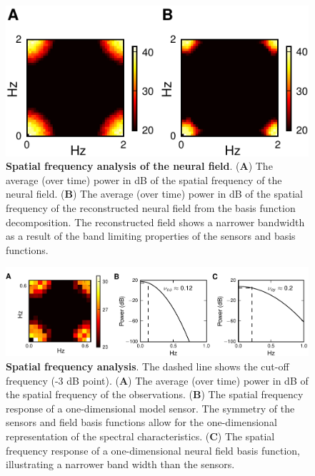 \documentclass[10pt]{article}
\begin{document}
\begin{figure}[!ht]
\begin{center}
\includegraphics{./Graph/pdf/Figure4.pdf}
\end{center}
\caption{{\bf Spatial frequency analysis of the neural field}. (\textbf{A}) The average (over time) power in dB of the spatial frequency of the neural field. (\textbf{B}) The average (over time) power in dB of the spatial frequency of the reconstructed neural field from the basis function decomposition. The reconstructed field shows a narrower bandwidth as a result of the band limiting properties of the sensors and basis functions.}
\label{fig:FFTTrueEstimate}
\end{figure}

\begin{figure}[!ht] 
\begin{center}
\includegraphics{./Graph/pdf/Figure5.pdf}	
\end{center}
\caption{{\bf Spatial frequency analysis}. The dashed line shows the cut-off frequency (-3 dB point). (\textbf{A}) The average (over time) power in dB of the spatial frequency of the observations. (\textbf{B}) The spatial frequency response of a one-dimensional model sensor. The symmetry of the sensors and field basis functions allow for the one-dimensional representation of the spectral characteristics. (\textbf{C}) The spatial frequency response of a one-dimensional neural field basis function, illustrating a narrower band width than the sensors. }
\label{fig:ObservationFreqAnal}
\end{figure}
\end{document}
